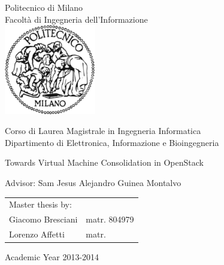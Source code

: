 \begin{titlepage}
\vspace*{-2.5cm}
\bfseries

\begin{center}
\LARGE
Politecnico di Milano\\
\Large
Facolt\`{a} di Ingegneria dell'Informazione\\
\vspace{0.5cm}
\includegraphics[width=4cm]{images/logo_polimi.png}
\vspace*{3cm}


\begin{large}
Corso di Laurea Magistrale in Ingegneria Informatica\\
Dipartimento di Elettronica, Informazione e Bioingegneria\\
\end{large}

\vspace{1.0cm}
\begin{Large}
Towards Virtual Machine Consolidation in OpenStack\\
\end{Large}  
\end{center}

\vspace*{1.5cm}
\large
\begin{flushleft}
\hspace{-2cm}  Advisor: Sam Jesus Alejandro Guinea Montalvo\\
\end{flushleft}
\vspace*{1.5cm}

\hspace{5.5cm}
\parbox{10cm}{
    \begin{tabular}{ll}
         Master thesis by: & \\
         Giacomo Bresciani & matr. 804979\\
         Lorenzo Affetti & matr. \\
    \end{tabular}
}

\vspace*{1.5cm}
\begin{center}
  Academic Year 2013-2014
\end{center}

\end{titlepage}
\cleardoublepage

